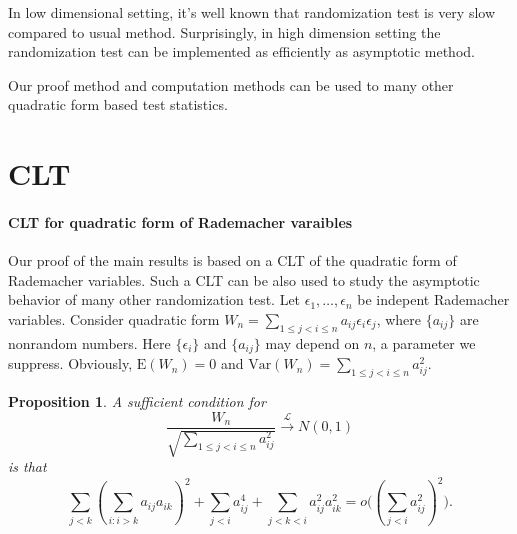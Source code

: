 \documentclass[review]{elsarticle}
\theoremstyle{plain}
\newtheorem{proposition}{\quad\quad Proposition}
\theoremstyle{definition}
\theoremstyle{remark}
\begin{document}
In low dimensional setting, it's well known that randomization test is very slow compared to usual method. 
Surprisingly, in high dimension setting the randomization test can be implemented as efficiently as asymptotic method.

Our proof method and computation methods can be used to many other quadratic form based test statistics.

\section{CLT}
\paragraph{CLT for quadratic form of Rademacher varaibles}
Our proof of the main results is based on a CLT of the quadratic form of Rademacher variables. 
Such a CLT can be also used to study the asymptotic behavior of many other randomization test.
 Let $\epsilon_1,\ldots,\epsilon_n$ be indepent Rademacher  variables. 
 Consider quadratic form $W_n=\sum_{1\leq j<i\leq n} a_{ij}\epsilon_i \epsilon_j$, where $\{a_{ij}\}$ are nonrandom numbers. Here $\{\epsilon_i\}$ and $\{a_{ij}\}$ may depend on $n$, a parameter we suppress.
 Obviously, $\mathrm{E}(W_n)=0$ and $\mathrm{Var}(W_n)=\sum_{1\leq j<i\leq n} a_{ij}^2$.

 \begin{proposition}\label{CLTprop}
     A sufficient condition for
     \begin{equation}
         \frac{W_n}{\sqrt{\sum_{1\leq j<i\leq n} a_{ij}^2}}\xrightarrow{\mathcal{L}} N(0,1)
     \end{equation}
     is that
     \begin{equation}
         \sum_{j<k}{(\sum_{i:i>k}a_{ij}a_{ik})}^2+
         \sum_{j<i}a_{ij}^4+
         \sum_{j<k<i}a_{ij}^2 a_{ik}^2
         =o\big({(\sum_{j<i} a_{ij}^2)}^2\big).
     \end{equation}
 \end{proposition}
\end{document}
